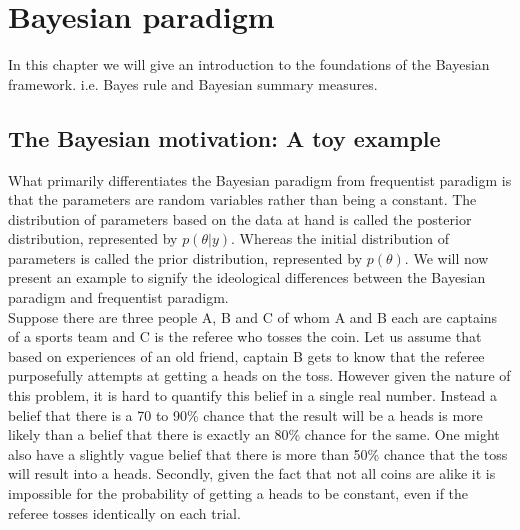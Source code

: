 
\chapter{Bayesian paradigm}
\label{ch : bayesian_paradigm}
In this chapter we will give an introduction to the foundations of the Bayesian framework. i.e. Bayes rule and Bayesian summary measures. 

\section{The Bayesian motivation: A toy example}
What primarily differentiates the Bayesian paradigm from frequentist paradigm is that the parameters are random variables rather than being a constant. The distribution of parameters based on the data at hand is called the posterior distribution, represented by $p(\theta|y)$. Whereas the initial distribution of parameters is called the prior distribution, represented by $p(\theta)$. We will now present an example to signify the ideological differences between the Bayesian paradigm and frequentist paradigm.\\

Suppose there are three people A, B and C of whom A and B each are captains of a sports team and C is the referee who tosses the coin. Let us assume that based on experiences of an old friend, captain B gets to know that the referee purposefully attempts at getting a heads on the toss. However given the nature of this problem, it is hard to quantify this belief in a single real number. Instead a belief that there is a 70 to 90\% chance that the result will be a heads is more likely than a belief that there is exactly an 80\% chance for the same. One might also have a slightly vague belief that there is more than 50\% chance that the toss will result into a heads. Secondly, given the fact that not all coins are alike it is impossible for the probability of getting a heads to be constant, even if the referee tosses identically on each trial.\\

